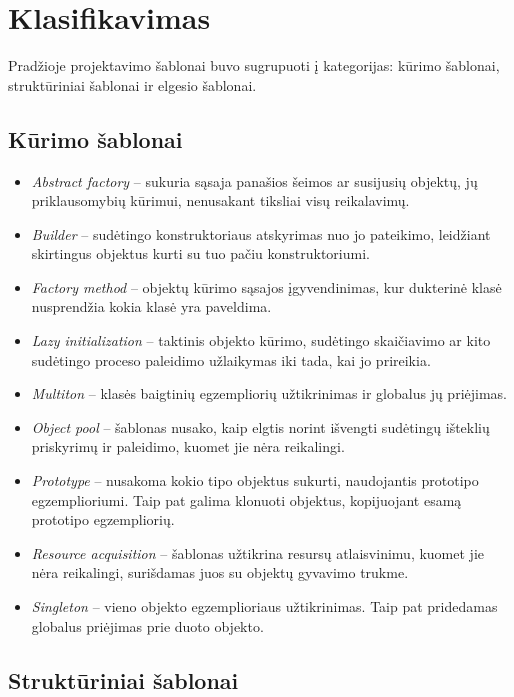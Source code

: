 \documentclass[10pt]{IEEEtran}
\begin{document}
	\section{Klasifikavimas}

		Pradžioje projektavimo šablonai buvo sugrupuoti į kategorijas: kūrimo šablonai, struktūriniai šablonai ir elgesio šablonai. 

		\subsection{Kūrimo šablonai}

			\begin{itemize}
				\item \textit{Abstract factory} -- sukuria sąsaja panašios šeimos ar susijusių objektų, jų priklausomybių kūrimui, nenusakant tiksliai visų reikalavimų.
				\item \textit{Builder} -- sudėtingo konstruktoriaus atskyrimas nuo jo pateikimo, leidžiant skirtingus objektus kurti su tuo pačiu konstruktoriumi.
				\item \textit{Factory method} -- objektų kūrimo sąsajos įgyvendinimas, kur dukterinė klasė nusprendžia kokia klasė yra paveldima.
				\item \textit{Lazy initialization} -- taktinis objekto kūrimo, sudėtingo skaičiavimo ar kito sudėtingo proceso paleidimo užlaikymas iki tada, kai jo prireikia.
				\item \textit{Multiton} -- klasės baigtinių egzempliorių užtikrinimas ir globalus jų priėjimas.
				\item \textit{Object pool} -- šablonas nusako, kaip elgtis norint išvengti sudėtingų išteklių priskyrimų ir paleidimo, kuomet jie nėra reikalingi.
				\item \textit{Prototype} -- nusakoma kokio tipo objektus sukurti, naudojantis prototipo egzemplioriumi. Taip pat galima klonuoti objektus, kopijuojant esamą prototipo egzempliorių.
				\item \textit{Resource acquisition} -- šablonas užtikrina resursų atlaisvinimu, kuomet jie nėra reikalingi, surišdamas juos su objektų gyvavimo trukme.
				\item \textit{Singleton} -- vieno objekto egzemplioriaus užtikrinimas. Taip pat pridedamas globalus priėjimas prie duoto objekto.
			\end{itemize}

		\subsection{Struktūriniai šablonai}
\end{document}
